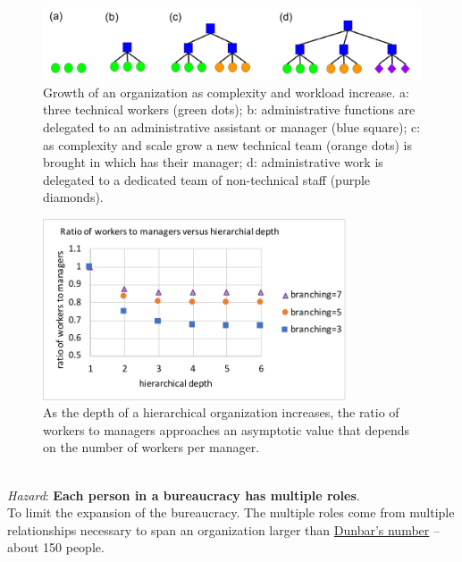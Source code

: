     \begin{figure}
        \centering
        \includegraphics[width=1\textwidth]{images/growth-of-bureaucracy.pdf}
        \caption{Growth of an organization as complexity and workload increase. a: three technical workers (green dots); b: administrative functions are delegated to an administrative assistant or manager (blue square); c: as complexity and scale grow a new technical team (orange dots) is brought in which has their manager; d: administrative work is delegated to a dedicated team of non-technical staff (purple diamonds).}
        \label{fig:growth_of_bureaucracy}
    \end{figure}

    \begin{figure}
        \centering
        \includegraphics[width=0.8\textwidth]{images/growth-of-bureaucracy-plot.pdf}
        \caption{As the depth of a hierarchical organization increases, the ratio of workers to managers approaches an asymptotic value that depends on the number of workers per manager. }
        \label{fig:growth_of_bureaucracy-plot}
    \end{figure}


\ \\
\textit{Hazard}: \textbf{Each person in a bureaucracy has multiple roles}.\\
To limit the expansion of the bureaucracy. The multiple roles come from multiple relationships necessary to span an organization larger than \href{https://en.wikipedia.org/wiki/Dunbar\%27s_number}{Dunbar's number} -- about 150 people. \iftoggle{WPinmargin}{\marginpar{$>$Wikipedia: Dunbar's number}}{}

